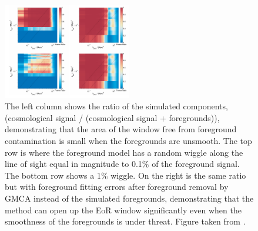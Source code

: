 \begin{figure}
\begin{center}
    \includegraphics[width=0.5\textwidth]{Images/Em_window.png}
\end{center}
    \caption{The left column shows the ratio of the simulated components, (cosmological signal / (cosmological signal + foregrounds)), demonstrating that the area of the window free from foreground contamination is small when the foregrounds are unsmooth. The top row is where the foreground model has a random wiggle along the line of sight equal in magnitude to 0.1$\%$ of the foreground signal. The bottom row shows a 1$\%$ wiggle. On the right is the same ratio but with foreground fitting errors after foreground removal by GMCA instead of the simulated foregrounds, demonstrating that the method can open up the EoR window significantly even when the smoothness of the foregrounds is under threat. Figure taken from \citet{Chapman2016MNRAS.458.2928C}.}
    \label{fig:Chap_window}
\end{figure}

